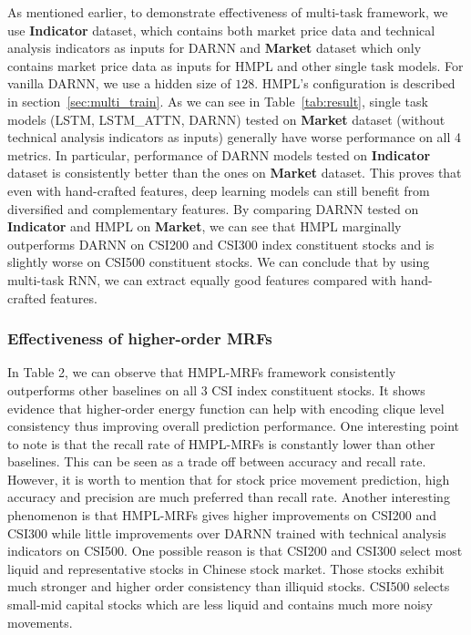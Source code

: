 \documentclass[sigconf]{acmart}
\begin{document}
As mentioned earlier, to demonstrate effectiveness of multi-task
framework, we use \textbf{Indicator} dataset, which contains both
market price data and technical analysis indicators as inputs for
DARNN and \textbf{Market} dataset which only contains market
price data as inputs for HMPL and other single task models. For
vanilla DARNN, we use a hidden size of $128$. HMPL's
configuration is described in section~\ref{sec:multi_train}. As
we can see in Table~\ref{tab:result}, single task models (LSTM,
LSTM\_ATTN, DARNN) tested on \textbf{Market} dataset (without
technical analysis indicators as inputs) generally have worse
performance on all 4 metrics. In particular, performance of DARNN
models tested on \textbf{Indicator} dataset is consistently
better than the ones on \textbf{Market} dataset. This proves that
even with hand-crafted features, deep learning models can still
benefit from diversified and complementary features. By comparing
DARNN tested on \textbf{Indicator} and HMPL on \textbf{Market},
we can see that HMPL marginally outperforms DARNN on CSI200 and
CSI300 index constituent stocks and is slightly worse on CSI500
constituent stocks. We can conclude that by using multi-task
RNN, we can extract equally good features compared with
hand-crafted features.

\subsubsection{Effectiveness of higher-order MRFs}

In Table 2, we can observe that HMPL-MRFs framework consistently outperforms other baselines on all 3 CSI index constituent stocks. It shows evidence that higher-order energy function can help with
encoding clique level consistency thus improving overall
prediction performance. One interesting point to note is that the recall rate of HMPL-MRFs is constantly lower than other baselines. This can be seen as a trade off between accuracy and recall rate. However, it is worth to mention that for stock price movement prediction, high accuracy and precision are much preferred than recall rate. Another interesting phenomenon is that HMPL-MRFs gives higher improvements on CSI200 and CSI300 while little improvements over DARNN trained with technical
analysis indicators on CSI500. One possible reason is that CSI200 and CSI300 select most liquid and representative stocks in Chinese stock market. Those stocks exhibit much stronger and higher order consistency than illiquid stocks. CSI500 selects small-mid
capital stocks which are less liquid and contains much more noisy movements.
\end{document}
